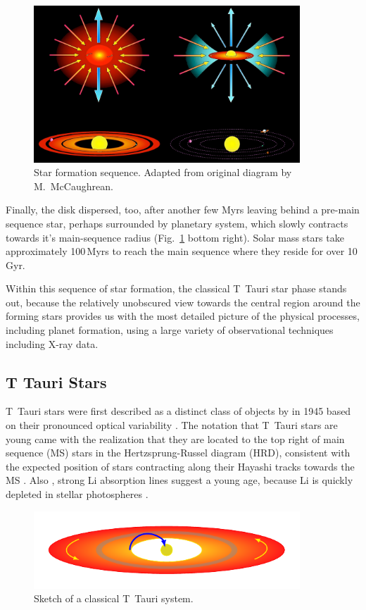 \begin{figure}[t]
\centering
\includegraphics[width=10cm]{figs/starform_classes.png}
\caption{Star formation sequence. Adapted from original diagram by M.~McCaughrean. \label{fig:starform_classes}}
\end{figure}

Finally, the disk dispersed, too, after another few Myrs leaving behind a pre-main sequence star, perhaps surrounded by planetary system, which slowly contracts towards it's  main-sequence radius (Fig.~\ref{fig:starform_classes} bottom right). Solar mass stars take approximately 100\,Myrs to reach the main sequence where they reside for over 10\,Gyr.

Within this sequence of star formation, the classical T~Tauri star phase stands out, because the relatively unobscured view towards the central region around the forming stars provides us with the most detailed picture of the physical processes, including planet formation, using a large variety of observational techniques including X-ray data.

\subsection{T Tauri Stars}
T~Tauri stars were first described as a distinct class of objects  by \citeauthor{Joy_1945} in 1945 based on their pronounced optical variability \citep{Joy_1945}. The notation that T~Tauri stars are young came with the realization that they are located to the top right of  main sequence (MS) stars in the Hertzsprung-Russel diagram (HRD), consistent with the expected position of stars contracting along their Hayashi tracks towards the MS \citep{Hayashi_1961}. Also , strong Li absorption lines suggest a young age, because  Li is quickly depleted in stellar photospheres \citep{Magazzu_1992}.


\begin{figure}[t]
\centering
\includegraphics[width=10cm]{sketches/ctts.pdf}
\caption{Sketch of a classical T~Tauri system. \label{fig:ctts_sketch}}
\end{figure}


